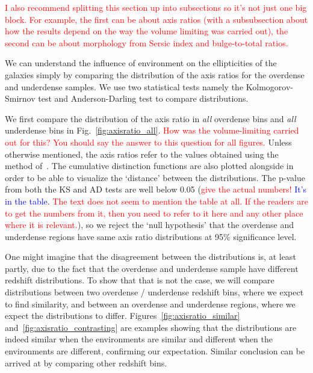 \documentclass[twocolumn,useAMS,usenatbib]{mn2e}
\newcommand{\rachel}[1]{{\textcolor{red}{#1}}}
\newcommand{\arun}[1]{{\textcolor{blue}{#1}}}
\begin{document}
\rachel{I also recommend splitting this section up into subsections so
  it's not just one big block.  For example, the first can be about
  axis ratios (with a subsubsection about how the results depend on
  the way the volume limiting was carried out), the second can be
  about morphology from Sersic index and bulge-to-total ratios.}

We can understand the influence of environment on the ellipticities of the galaxies simply by comparing the distribution of the axis ratios for the overdense and underdense samples. 
We use two statistical tests namely the Kolmogorov-Smirnov test and Anderson-Darling test to compare distributions.

We first compare the distribution of the axis ratio in \emph{all}
overdense bins and \emph{all} underdense bins in
Fig.~\ref{fig:axisratio_all}. \rachel{How was the volume-limiting
  carried out for this?  You should say the answer to this question
  for all figures.} Unless otherwise mentioned, the axis ratios refer to the values obtained using the method of~\cite{Claire_Fits}.
The cumulative distinction functions are also plotted alongside in order to be able to visualize the `distance' between the distributions.
The p-value from both the KS and AD tests are well below 0.05
(\rachel{give the actual numbers!} \arun{It's in the table.}
\rachel{The text does not seem to mention the table at all.  If the
  readers are to get the numbers from it, then you need to refer to it
here and any other place where it is relevant.}), 
so we reject the `null hypothesis' that the overdense and underdense regions have same axis ratio distributions at 95\% significance level.

One might imagine that the disagreement between the distributions is, at least partly, due to the fact that the overdense and underdense sample have different redshift distributions.
To show that that is not the case, we will compare distributions between two overdense / underdense redshift bins, where we expect to find similarity, and between an overdense and underdense regions,
where we expect the distributions to differ.
Figures~\ref{fig:axisratio_similar} and~\ref{fig:axisratio_contrasting} are examples showing that the distributions are indeed similar when the environments are similar and different when the environments are different, confirming our expectation.
Similar conclusion can be arrived at by comparing other redshift bins.
\end{document}
